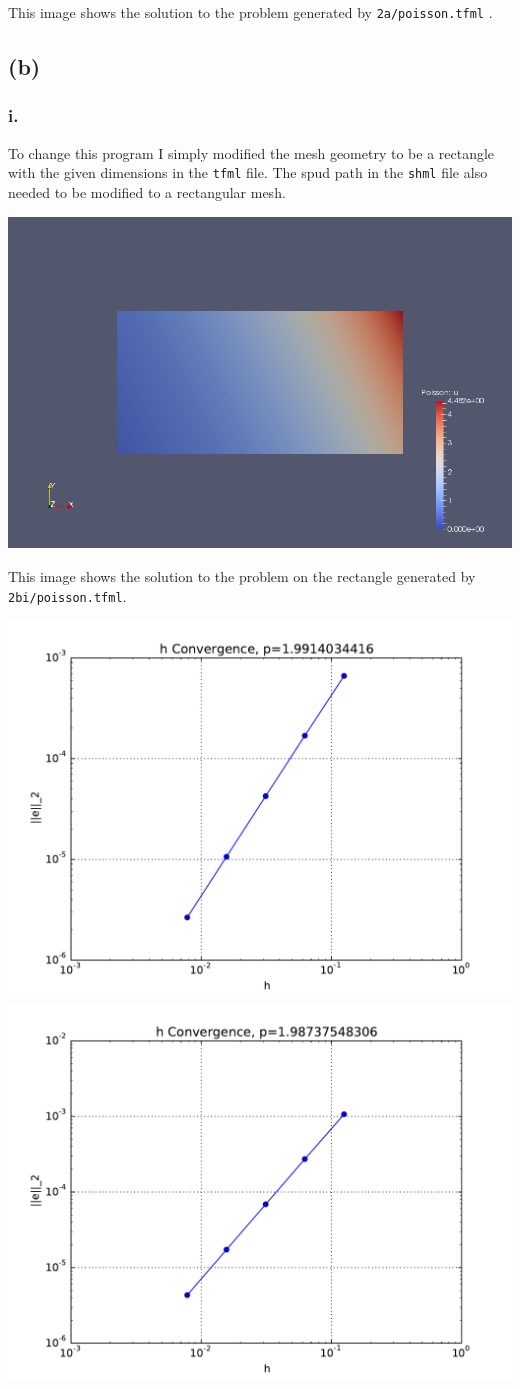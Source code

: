 \documentclass{article}
\begin{document}
This image shows the solution to the problem generated by \verb|2a/poisson.tfml| .

\subsection*{(b)}
\subsubsection*{i.}
To change this program I simply modified the mesh geometry to be a rectangle with the given dimensions in the \verb|tfml| file. The spud path in the \verb|shml| file also needed to be modified to a rectangular mesh.

\includegraphics[width=\linewidth]{2biSolution.png}

This image shows the solution to the problem on the rectangle generated by \verb|2bi/poisson.tfml|.

\includegraphics[width=.5\linewidth]{2biConvergence.pdf}
\includegraphics[width=.5\linewidth]{2biConvergenceSquare.pdf}
\end{document}
